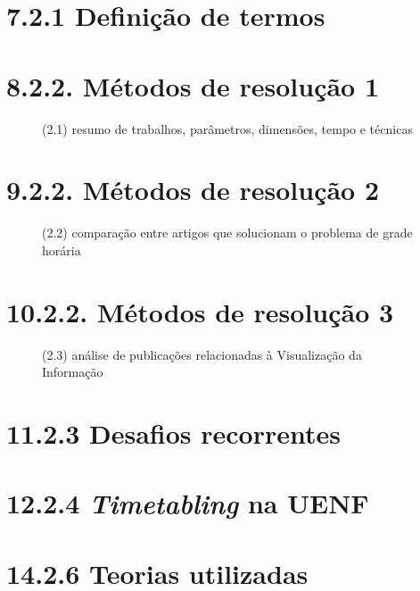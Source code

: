 \chapter{7.2.1 Definição de termos}
\cite{Alencar2019}

\cite{Wren1996}

\cite{Wren1996}

\cite{Alencar2019}
\chapter*{8.2.2. Métodos de resolução 1}
\begin{figure}[htpb]\caption{(2.1) resumo de trabalhos, parâmetros, dimensões, tempo e técnicas} \end{figure}
\chapter*{9.2.2. Métodos de resolução 2}
\begin{figure}[htpb]\caption{(2.2) comparação entre artigos que solucionam o problema de grade horária} \end{figure}
\chapter*{10.2.2. Métodos de resolução 3}
\begin{figure}[htpb]\caption{(2.3) análise de publicações relacionadas à Visualização da Informação} \end{figure}
\chapter*{11.2.3 Desafios recorrentes}
\cite{miranda_udpskeduler_2012}

\cite{Murray2007}

\cite{Andre2018, bebis_information_2019, Alencar2019}
\chapter*{12.2.4 \textit{Timetabling} na UENF}
\cite{Sanya2013}

\cite{Ricardo2014}
\chapter*{14.2.6 Teorias utilizadas}
\cite{dunke_matheuristic_2023, Souza2000}

